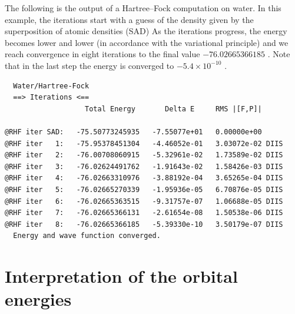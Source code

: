 \documentclass[../Main/notes.tex]{subfiles}
\begin{document}
The following is the output of a Hartree--Fock computation on water.
In this example, the iterations start with a guess of the density given by the superposition of atomic densities (SAD)
As the iterations progress, the energy becomes lower and lower (in accordance with the variational principle) and we reach convergence in eight iterations to the final value $-76.02665366185$ \Eh.
Note that in the last step the energy is converged to $-5.4 \times 10^{-10}$ \Eh.
\begin{small}
\begin{verbatim}
  Water/Hartree-Fock
  ==> Iterations <==
                   Total Energy       Delta E     RMS |[F,P]|

@RHF iter SAD:   -75.50773245935   -7.55077e+01   0.00000e+00 
@RHF iter   1:   -75.95378451304   -4.46052e-01   3.03072e-02 DIIS
@RHF iter   2:   -76.00708060915   -5.32961e-02   1.73589e-02 DIIS
@RHF iter   3:   -76.02624491762   -1.91643e-02   1.58426e-03 DIIS
@RHF iter   4:   -76.02663310976   -3.88192e-04   3.65265e-04 DIIS
@RHF iter   5:   -76.02665270339   -1.95936e-05   6.70876e-05 DIIS
@RHF iter   6:   -76.02665363515   -9.31757e-07   1.06688e-05 DIIS
@RHF iter   7:   -76.02665366131   -2.61654e-08   1.50538e-06 DIIS
@RHF iter   8:   -76.02665366185   -5.39330e-10   3.50179e-07 DIIS
  Energy and wave function converged.
\end{verbatim}
\end{small}


\section{Interpretation of the orbital energies}
\end{document}
